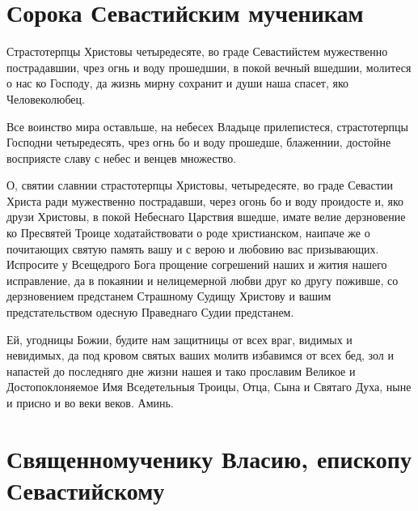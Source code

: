  

\section{Сорока Севастийским мученикам}
 



Страстотерпцы Христовы четыредесяте, во граде Севастийстем мужественно пострадавшии, чрез огнь и воду прошедшии, в покой вечный вшедшии, молитеся о нас ко Господу, да жизнь мирну сохранит и души наша спасет, яко Человеколюбец.




Все воинство мира оставльше, на небесех Владыце прилепистеся, страстотерпцы Господни четыредесять, чрез огнь бо и воду прошедше, блаженнии, достойне восприясте славу с небес и венцев множество.




О, святии славнии страстотерпцы Христовы, четыредесяте, во граде Севастии Христа ради мужественно пострадавши, через огонь бо и воду проидосте и, яко друзи Христовы, в покой Небеснаго Царствия вшедше, имате велие дерзновение ко Пресвятей Троице ходатайствовати о роде христианском, наипаче же о почитающих святую память вашу и с верою и любовию вас призывающих. Испросите у Всещедрого Бога прощение согрешений наших и жития нашего исправление, да в покаянии и нелицемерной любви друг ко другу поживше, со дерзновением предстанем Страшному Судищу Христову и вашим предстательством одесную Праведнаго Судии предстанем.

Ей, угодницы Божии, будите нам защитницы от всех враг, видимых и невидимых, да под кровом святых ваших молитв избавимся от всех бед, зол и напастей до последняго дне жизни нашея и тако прославим Великое и Достопоклоняемое Имя Вседетельныя Троицы, Отца, Сына и Святаго Духа, ныне и присно и во веки веков. Аминь.
\longpage{}\mychapterending


 

\vspace{-2\baselineskip}\section{Священномученику Власию, епископу Севастийскому}
 
